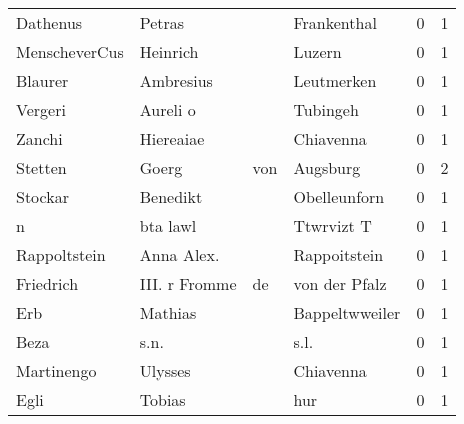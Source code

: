 \begin{tabular}{llllrr}
                 Dathenus &                             Petras &             &                                 Frankenthal &          0 &         1 \\
            MenscheverCus &                           Heinrich &             &                                      Luzern &          0 &         1 \\
                  Blaurer &                          Ambresius &             &                                  Leutmerken &          0 &         1 \\
                  Vergeri &                           Aureli o &             &                                    Tubingeh &          0 &         1 \\
                   Zanchi &                          Hiereaiae &             &                                   Chiavenna &          0 &         1 \\
                  Stetten &                              Goerg &         von &                                    Augsburg &          0 &         2 \\
                  Stockar &                           Benedikt &             &                                Obelleunforn &          0 &         1 \\
                        n &                           bta lawl &             &                                  Ttwrvizt T &          0 &         1 \\
             Rappoltstein &                         Anna Alex. &             &                                Rappoitstein &          0 &         1 \\
                Friedrich &                      III. r Fromme &          de &                               von der Pfalz &          0 &         1 \\
                      Erb &                            Mathias &             &                              Bappeltwweiler &          0 &         1 \\
                     Beza &                               s.n. &             &                                        s.l. &          0 &         1 \\
               Martinengo &                            Ulysses &             &                                   Chiavenna &          0 &         1 \\
                     Egli &                             Tobias &             &                                         hur &          0 &         1 \\

\end{tabular}
